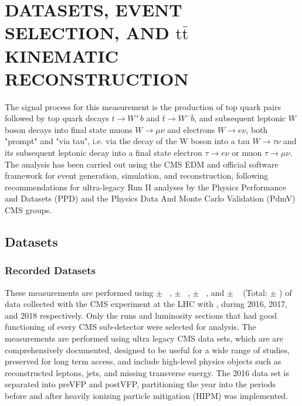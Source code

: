 
\chapter{DATASETS, EVENT SELECTION, AND \ensuremath{\mathrm{t\bar{t}}} KINEMATIC RECONSTRUCTION}
\label{Datasets_Event_Selection_Kinematic_Reconstruction}
The signal process for this measurement is the production of top quark pairs followed by top quark decays $t\to W^+ b$ and $\bar{t}\to W^- \bar{b}$, and subsequent leptonic $W$ boson decays into final state muons $W\to \mu\nu$ and electrons $W\to e\nu$, both "prompt" and "via tau", i.e. via the decay of the W boson into a tau $W\to \tau\nu$ and its subsequent leptonic decay into a final state electron $\tau\to e\nu$ or muon $\tau\to \mu\nu$.
The analysis has been carried out using the CMS EDM and official software framework for event generation, simulation, and reconstruction, following recommendations for ultra-legacy Run II analyses by the Physics Performance and Datasets (PPD) and the Physics Data And Monte Carlo Validation (PdmV) CMS groups.

\section{Datasets}

\subsection{Recorded Datasets}
These measurements are performed using \lumivalueSixPreVFP $\pm$ \lumierrSixPreVFP~\cite{bib:lumipas16}, \lumivalueSixPostVFP $\pm$ \lumierrSixPostVFP~\cite{bib:lumipas16}, \lumivalueSeven $\pm$ \lumierrSeven~\cite{bib:lumipas17}, and \lumivalueEight $\pm$ \lumierrEight~\cite{bib:lumipas18} (Total: \lumivalueRuniiUL $\pm$ \lumierrRuniiUL) of data collected with the CMS experiment at the LHC with \beamenergy, during 2016, 2017, and 2018 respectively.
Only the runs and luminosity sections that had good functioning of every CMS sub-detector were selected for analysis.
The measurements are performed using ultra legacy CMS data sets, which are are comprehensively documented, designed to be useful for a wide range of studies, preserved for long term access, and include high-level physics objects such as reconstructed leptons, jets, and missing transverse energy.
The 2016 data set is separated into preVFP and postVFP, partitioning the year into the periods before and after heavily ionizing particle mitigation (HIPM) was implemented.

